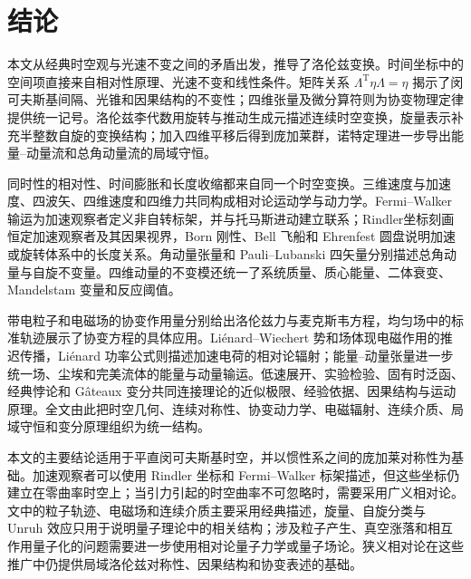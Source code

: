 \documentclass[style=classic,color=full]{lc-article}
\begin{document}
\section{结论}

本文从经典时空观与光速不变之间的矛盾出发，推导了洛伦兹变换。时间坐标中的空间项直接来自相对性原理、光速不变和线性条件。矩阵关系 $\Lambda^{\mathrm T}\eta\Lambda=\eta$ 揭示了闵可夫斯基间隔、光锥和因果结构的不变性；四维张量及微分算符则为协变物理定律提供统一记号。洛伦兹李代数用旋转与推动生成元描述连续时空变换，旋量表示补充半整数自旋的变换结构；加入四维平移后得到庞加莱群，诺特定理进一步导出能量--动量流和总角动量流的局域守恒。

同时性的相对性、时间膨胀和长度收缩都来自同一个时空变换。三维速度与加速度、四波矢、四维速度和四维力共同构成相对论运动学与动力学。Fermi--Walker 输运为加速观察者定义非自转标架，并与托马斯进动建立联系；Rindler坐标刻画恒定加速观察者及其因果视界，Born 刚性、Bell 飞船和 Ehrenfest 圆盘说明加速或旋转体系中的长度关系。角动量张量和 Pauli--Lubanski 四矢量分别描述总角动量与自旋不变量。四维动量的不变模还统一了系统质量、质心能量、二体衰变、Mandelstam 变量和反应阈值。

带电粒子和电磁场的协变作用量分别给出洛伦兹力与麦克斯韦方程，均匀场中的标准轨迹展示了协变方程的具体应用。Li\'enard--Wiechert 势和场体现电磁作用的推迟传播，Li\'enard 功率公式则描述加速电荷的相对论辐射；能量--动量张量进一步统一场、尘埃和完美流体的能量与动量输运。低速展开、实验检验、固有时泛函、经典悖论和 G\^ateaux 变分共同连接理论的近似极限、经验依据、因果结构与运动原理。全文由此把时空几何、连续对称性、协变动力学、电磁辐射、连续介质、局域守恒和变分原理组织为统一结构。

本文的主要结论适用于平直闵可夫斯基时空，并以惯性系之间的庞加莱对称性为基础。加速观察者可以使用 Rindler 坐标和 Fermi--Walker 标架描述，但这些坐标仍建立在零曲率时空上；当引力引起的时空曲率不可忽略时，需要采用广义相对论。文中的粒子轨迹、电磁场和连续介质主要采用经典描述，旋量、自旋分类与 Unruh 效应只用于说明量子理论中的相关结构；涉及粒子产生、真空涨落和相互作用量子化的问题需要进一步使用相对论量子力学或量子场论。狭义相对论在这些推广中仍提供局域洛伦兹对称性、因果结构和协变表述的基础。

\lcbibliography
\end{document}
